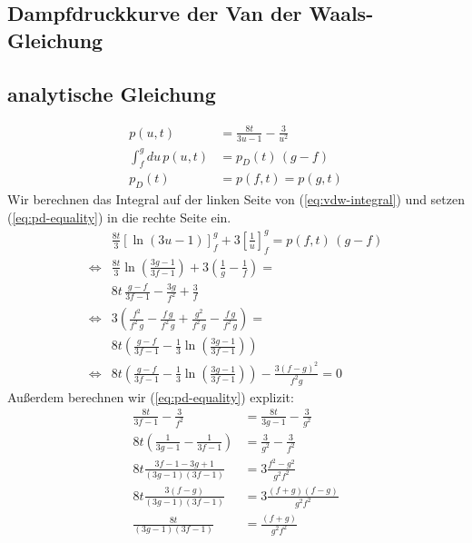 \documentclass[10pt]{article}
\begin{document}
\begin{multicols}{2}
  \section{Dampfdruckkurve der Van der Waals-Gleichung}

  \subsection{analytische Gleichung}
  \begin{align}
    p(u, t) &= \frac{8t}{3u-1} - \frac{3}{u^2} \label{eq:vdw-universal} \\
    \int_f^g du\,p(u, t) &= p_D(t)\,(g-f) \label{eq:vdw-integral} \\
    p_D(t) &= p(f, t) = p(g, t) \label{eq:pd-equality}
  \end{align}
  Wir berechnen das Integral auf der linken Seite von (\ref{eq:vdw-integral}) 
  und setzen (\ref{eq:pd-equality}) in die rechte Seite ein.
  \begin{align}
    &\frac{8t}{3} \left[\ln{(3u-1)}\right]_f^g + 3 \left[\frac{1}{u}\right]_f^g = p(f, t)\,(g-f) \nonumber \\
    \iff &\frac{8t}{3} \ln{\left(\frac{3g-1}{3f-1}\right)} + 3\left(\frac{1}{g} - \frac{1}{f}\right) = \nonumber \\
    &8t\, \frac{g-f}{3f-1} - \frac{3g}{f^2} + \frac{3}{f} \nonumber \\
    \iff &3 \left(\frac{f^2}{f^2\,g} - \frac{f\,g}{f^2\,g} + \frac{g^2}{f^2\,g} - \frac{f\,g}{f^2\,g}\right) = \nonumber \\
    &8t \left(\frac{g-f}{3f-1} - \frac{1}{3} \ln{\left(\frac{3g-1}{3f-1}\right)} \right) \nonumber \\
    \iff &8t \left(\frac{g-f}{3f-1} - \frac{1}{3} \ln{\left(\frac{3g-1}{3f-1}\right)} \right)
    - \frac{3(f-g)^2}{f^2g} = 0 \label{eq:root-eq}
  \end{align}
  Außerdem berechnen wir (\ref{eq:pd-equality}) explizit:
  \begin{align}
    \frac{8t}{3f-1} - \frac{3}{f^2} &= \frac{8t}{3g-1} - \frac{3}{g^2} \nonumber \\
    8t \left(\frac{1}{3g-1} - \frac{1}{3f-1}\right) &= \frac{3}{g^2} - \frac{3}{f^2} \nonumber \\
    8t \frac{3f-1-3g+1}{(3g-1)(3f-1)} &= 3 \frac{f^2-g^2}{g^2f^2} \nonumber \\
    8t \frac{3(f-g)}{(3g-1)(3f-1)} &= 3\frac{(f+g)(f-g)}{g^2f^2} \nonumber \\
    \frac{8t}{(3g-1)(3f-1)} &= \frac{(f+g)}{g^2f^2}

\end{align}
\end{multicols}
\end{document}
